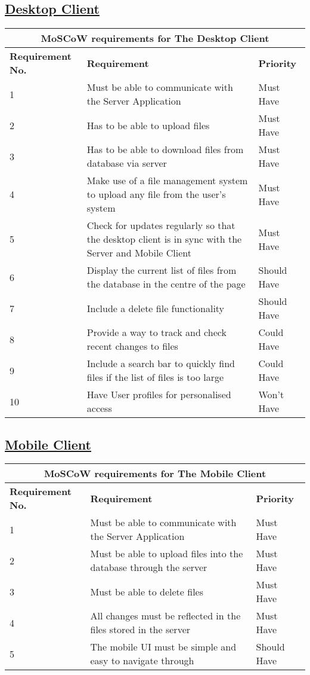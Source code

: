\documentclass{article}
\begin{document}
\subsection{\underline{Desktop Client}}
\begin{tabular}{|p{3cm}|p{5cm}|p{4cm}|}
\hline
\multicolumn{3}{|c|}{\textbf{MoSCoW requirements for The Desktop Client}} \\
\hline
\textbf{Requirement No.} & \textbf{Requirement} & \textbf{Priority}\\
\hline
1 & Must be able to communicate with the Server Application & Must Have \\
\hline
2 & Has to be able to upload files & Must Have \\
\hline
3 & Has to be able to download files from database via server & Must Have \\
\hline
4 & Make use of a file management system to upload any file from the user's system & Must Have \\
\hline
5 & Check for updates regularly so that the desktop client is in sync with the Server and Mobile Client & Must Have\\
\hline
6 & Display the current list of files from the database in the centre of the page & Should Have \\
\hline
7 & Include a delete file functionality   & Should Have \\
\hline
8 & Provide a way to track and check recent changes to files & Could Have\\
\hline
9 & Include a search bar to quickly find files if the list of files is too large & Could Have \\
\hline
10 & Have User profiles for personalised access & Won't Have \\
\hline
\end{tabular}

\subsection{\underline{Mobile Client}}
\begin{tabular}{|p{3cm}|p{5cm}|p{4cm}|}
\hline
\multicolumn{3}{|c|}{\textbf{MoSCoW requirements for The Mobile Client}} \\
\hline
\textbf{Requirement No.} & \textbf{Requirement} & \textbf{Priority}\\
\hline
1 & Must be able to communicate with the Server Application & Must Have \\
\hline
2 & Must be able to upload files into the database through the server & Must Have \\
\hline
3 & Must be able to delete files & Must Have \\
\hline
4 & All changes must be reflected in the files stored in the server & Must Have \\
\hline
5 & The mobile UI must be simple and easy to navigate through & Should Have \\
\hline
\end{tabular}
\end{document}

